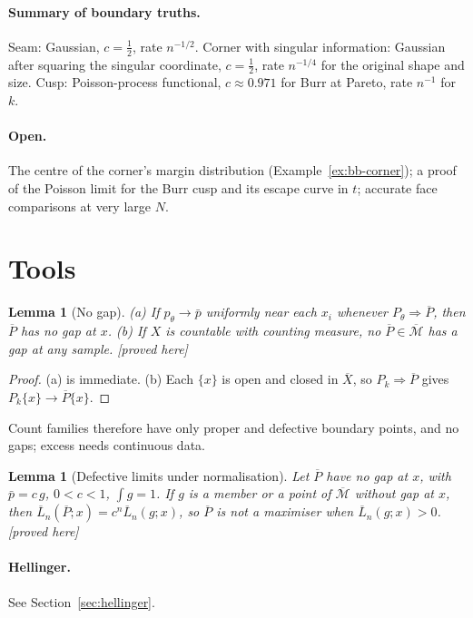 \documentclass[11pt]{article}
\newcommand{\bM}{\overline{\mathcal M}}
\newcommand{\bX}{\overline{X}}
\newcommand{\bP}{\overline P}
\newcommand{\bL}{\overline L}
\newcommand{\status}[1]{\textsf{[#1]}}
\newtheorem{lemma}[theorem]{Lemma}
\theoremstyle{definition}
\theoremstyle{remark}
\begin{document}
\paragraph{Summary of boundary truths.} Seam: Gaussian, $c=\frac12$, rate
$n^{-1/2}$. Corner with singular information: Gaussian after squaring the
singular coordinate, $c=\frac12$, rate $n^{-1/4}$ for the original shape
and size. Cusp: Poisson-process functional, $c\approx0.971$ for Burr at
Pareto, rate $n^{-1}$ for $k$.

\paragraph{Open.} The centre of the corner's margin distribution
(Example~\ref{ex:bb-corner}); a proof of the Poisson limit for the Burr cusp
and its escape curve in $t$; accurate face comparisons at very large $N$.

\section{Tools}
\begin{lemma}[No gap]\label{lem:exact}
(a) If $p_\theta\to\bar p$ uniformly near each $x_i$ whenever
$P_\theta\Rightarrow\bP$, then $\bP$ has no gap at $x$.
(b) If $X$ is countable with counting measure, no $\bP\in\bM$ has a gap at
any sample. \status{proved here}
\end{lemma}
\begin{proof}
(a) is immediate. (b) Each $\{x\}$ is open and closed in $\bX$, so
$P_k\Rightarrow\bP$ gives $P_k\{x\}\to\bP\{x\}$.
\end{proof}
Count families therefore have only proper and defective boundary points,
and no gaps; excess needs continuous data.

\begin{lemma}[Defective limits under normalisation]\label{lem:defective}
Let $\bP$ have no gap at $x$, with $\bar p=c\,g$, $0<c<1$, $\int g=1$. If
$g$ is a member or a point of $\bM$ without gap at $x$, then $\bL_n(\bP;x)=c^n\bL_n(g;x)$, so
$\bP$ is not a maximiser when $\bL_n(g;x)>0$. \status{proved here}
\end{lemma}

\paragraph{Hellinger.} See Section~\ref{sec:hellinger}.
\end{document}
